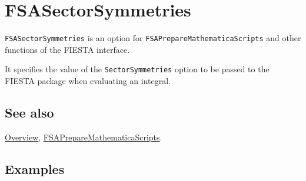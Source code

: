 \documentclass[../FeynHelpersManual.tex]{subfiles}
\begin{document}
\begin{Shaded}
\begin{Highlighting}[]
 
\end{Highlighting}
\end{Shaded}

\hypertarget{fsasectorsymmetries}{
\section{FSASectorSymmetries}\label{fsasectorsymmetries}}

\texttt{FSASectorSymmetries} is an option for
\texttt{FSAPrepareMathematicaScripts} and other functions of the FIESTA
interface.

It specifies the value of the \texttt{SectorSymmetries} option to be
passed to the FIESTA package when evaluating an integral.

\subsection{See also}

\hyperlink{toc}{Overview},
\hyperlink{fsapreparemathematicascripts}{FSAPrepareMathematicaScripts}.

\subsection{Examples}
\end{document}
